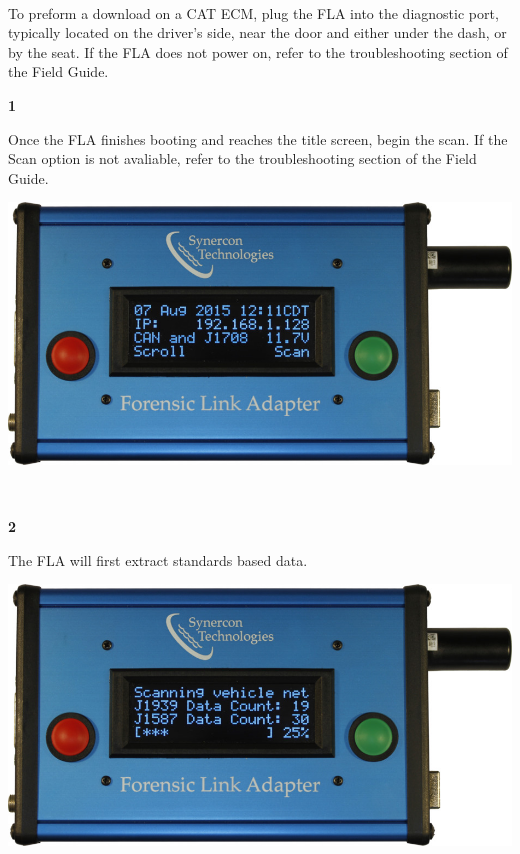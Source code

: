 \documentclass[11pt]{article}
\begin{document}
\paragraph{  }
To preform a download on a CAT ECM, plug the FLA into the diagnostic port, typically located on the driver's side, near the door and either under the dash, or by the seat. If the FLA does not power on, refer to the troubleshooting section of the Field Guide.
\\[\baselineskip]
\noindent\begin{minipage}{0.3\textwidth}%
\begin{center}
\textbf{1}\\[\baselineskip]
\end{center}
Once the FLA finishes booting and reaches the title screen, begin the scan. If the Scan option is not avaliable, refer to the troubleshooting section of the Field Guide.
\end{minipage}%
\hfill%
\begin{minipage}{0.6\textwidth}
\includegraphics[width=\linewidth]{../../media/fla_screens/ethernet_and_others/main/title_both}
\end{minipage}
\\[\baselineskip]
\noindent\begin{minipage}{0.3\textwidth}%
\begin{center}
\textbf{2}\\[\baselineskip]
\end{center}
The FLA will first extract standards based data.
\end{minipage}%
\hfill%
\begin{minipage}{0.6\textwidth}
\includegraphics[width=\linewidth]{../../media/fla_screens/ethernet_and_others/veh_scan/scan_25}
\end{minipage}
\end{document}
